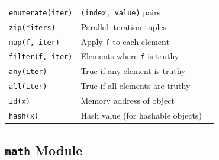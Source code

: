 \documentclass[oneside]{book}
\begin{document}
\begin{center}
\begin{tabularx}{\linewidth}{lXl}
\texttt{enumerate(iter)}     & \texttt{(index, value)} pairs           & \\
\texttt{zip(*iters)}         & Parallel iteration tuples               & \\
\texttt{map(f, iter)}        & Apply \texttt{f} to each element        & \\
\texttt{filter(f, iter)}     & Elements where \texttt{f} is truthy     & \\
\texttt{any(iter)}           & True if any element is truthy           & \\
\texttt{all(iter)}           & True if all elements are truthy         & \\
\texttt{id(x)}               & Memory address of object                & \\
\texttt{hash(x)}             & Hash value (for hashable objects)       & \\
\bottomrule
\end{tabularx}
\end{center}

\subsection*{\texttt{math} Module}
\end{document}
